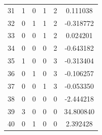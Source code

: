 \documentclass[preprint,12pt]{elsarticle}
\begin{document}
\begin{table}
\begin{minipage}[!h]{0.25\textwidth}
{\begin{tabular}{|c|cccc|c|}
31 &   1 &   0 &   1 &   2 &   0.111038 \\
32 &   0 &   1 &   1 &   2 &  -0.318772 \\
33 &   0 &   0 &   1 &   2 &   0.024201 \\
34 &   0 &   0 &   0 &   2 &  -0.643182 \\
35 &   1 &   0 &   0 &   3 &  -0.313404 \\
36 &   0 &   1 &   0 &   3 &  -0.106257 \\
37 &   0 &   0 &   1 &   3 &  -0.053350 \\
38 &   0 &   0 &   0 &   0 &  -2.444218 \\
39 &   3 &   0 &   0 &   0 &  34.800840 \\
40 &   0 &   1 &   0 &   0 &   2.392428 \\
\end{tabular}}
\end{minipage}%
\end{table}
%
\end{document}
